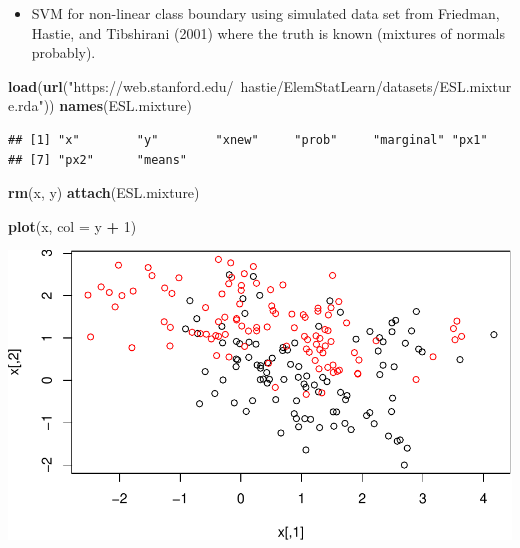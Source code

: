 \documentclass[]{article}
\newenvironment{Shaded}{\begin{snugshade}}{\end{snugshade}}
\newcommand{\DataTypeTok}[1]{\textcolor[rgb]{0.13,0.29,0.53}{#1}}
\newcommand{\DecValTok}[1]{\textcolor[rgb]{0.00,0.00,0.81}{#1}}
\newcommand{\KeywordTok}[1]{\textcolor[rgb]{0.13,0.29,0.53}{\textbf{#1}}}
\newcommand{\NormalTok}[1]{#1}
\newcommand{\OperatorTok}[1]{\textcolor[rgb]{0.81,0.36,0.00}{\textbf{#1}}}
\newcommand{\StringTok}[1]{\textcolor[rgb]{0.31,0.60,0.02}{#1}}
\providecommand{\tightlist}{%
  \setlength{\itemsep}{0pt}\setlength{\parskip}{0pt}}
\begin{document}
\begin{itemize}
\tightlist
\item
  SVM for non-linear class boundary using simulated data set from
  Friedman, Hastie, and Tibshirani (2001) where the truth is known
  (mixtures of normals probably).
\end{itemize}

\begin{Shaded}
\begin{Highlighting}[]
\KeywordTok{load}\NormalTok{(}\KeywordTok{url}\NormalTok{(}\StringTok{"https://web.stanford.edu/~hastie/ElemStatLearn/datasets/ESL.mixture.rda"}\NormalTok{))}
\KeywordTok{names}\NormalTok{(ESL.mixture)}
\end{Highlighting}
\end{Shaded}

\begin{verbatim}
## [1] "x"        "y"        "xnew"     "prob"     "marginal" "px1"     
## [7] "px2"      "means"
\end{verbatim}

\begin{Shaded}
\begin{Highlighting}[]
\KeywordTok{rm}\NormalTok{(x, y)}
\KeywordTok{attach}\NormalTok{(ESL.mixture)}

\KeywordTok{plot}\NormalTok{(x, }\DataTypeTok{col =}\NormalTok{ y }\OperatorTok{+}\StringTok{ }\DecValTok{1}\NormalTok{)}
\end{Highlighting}
\end{Shaded}

\includegraphics{9SVM_files/figure-latex/unnamed-chunk-29-1.pdf}
\end{document}
